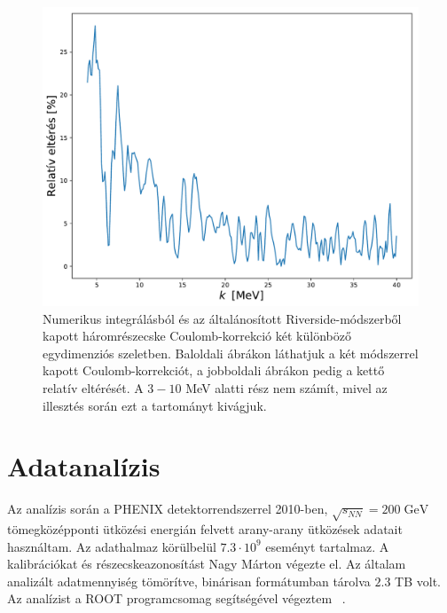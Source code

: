 \documentclass[11pt,a4paper]{article}
\numberwithin{equation}{subsection}
\numberwithin{figure}{section}
\begin{document}
\begin{figure}[H]
\includegraphics[scale=0.36]{pic/Coulomb/r3/K3-2_error.pdf}
\caption{Numerikus integrálásból és az általánosított Riverside-módszerből kapott háromrészecske Coulomb-korrekció két különböző egydimenziós szeletben. Baloldali ábrákon láthatjuk a két módszerrel kapott Coulomb-korrekciót, a jobboldali ábrákon pedig a kettő relatív eltérését. A $3-10$ MeV alatti rész nem számít, mivel az illesztés során ezt a tartományt kivágjuk.}
\label{fig:K3calc}
\end{figure}




\section{Adatanalízis}

Az analízis során a PHENIX detektorrendszerrel 2010-ben, $\sqrt{s_{NN}}=200\;\mathrm{GeV}$ tömegközépponti ütközési energián felvett arany-arany ütközések adatait használtam. Az adathalmaz körülbelül $7.3\cdot 10^9$ eseményt tartalmaz. A kalibrációkat és részecskeazonosítást Nagy Márton végezte el. Az általam analizált adatmennyiség tömörítve, binárisan formátumban tárolva $2.3$ TB volt. Az analízist a ROOT programcsomag segítségével végeztem ~\cite{root}.
\end{document}
